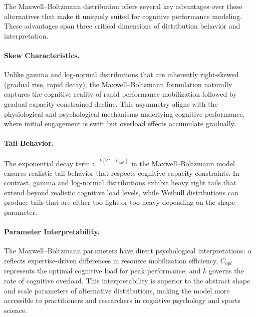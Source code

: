 \documentclass{article}
\begin{document}
The Maxwell--Boltzmann distribution offers several key advantages over these alternatives that make it uniquely 
suited for cognitive performance modeling. These advantages span three critical dimensions of distribution behavior 
and interpretation.

\paragraph{Skew Characteristics.} Unlike gamma and log-normal distributions that are inherently right-skewed 
(gradual rise, rapid decay), the Maxwell--Boltzmann formulation naturally captures the cognitive reality of rapid 
performance mobilization followed by gradual capacity-constrained decline. This asymmetry aligns with the 
physiological and psychological mechanisms underlying cognitive performance, where initial engagement is swift but 
overload effects accumulate gradually.

\paragraph{Tail Behavior.} The exponential decay term $e^{-k(C-C_{opt})}$ in the Maxwell--Boltzmann model ensures 
realistic tail behavior that respects cognitive capacity constraints. In contrast, gamma and log-normal distributions 
exhibit heavy right tails that extend beyond realistic cognitive load levels, while Weibull distributions can produce 
tails that are either too light or too heavy depending on the shape parameter.

\paragraph{Parameter Interpretability.} The Maxwell--Boltzmann parameters have direct psychological interpretations: 
$\alpha$ reflects expertise-driven differences in resource mobilization efficiency, $C_{opt}$ represents the optimal 
cognitive load for peak performance, and $k$ governs the rate of cognitive overload. This interpretability is 
superior to the abstract shape and scale parameters of alternative distributions, making the model more accessible 
to practitioners and researchers in cognitive psychology and sports science.
\end{document}
